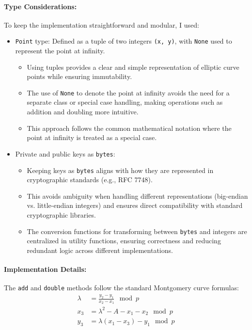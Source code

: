 \documentclass[twoside,a4paper,12pt]{article}
\begin{document}
\paragraph{Type Considerations:} 
To keep the implementation straightforward and modular, I used:
\begin{itemize}
    \item {\texttt{Point} type:} Defined as a tuple of two integers \texttt{(x, y)}, with \texttt{None} used to represent the point at infinity. 
    \begin{itemize}
        \item Using tuples provides a clear and simple representation of elliptic curve points while ensuring immutability.
        \item The use of \texttt{None} to denote the point at infinity avoids the need for a separate class or special case handling, making operations such as addition and doubling more intuitive.
        \item This approach follows the common mathematical notation where the point at infinity is treated as a special case.
    \end{itemize}
    \item Private and public keys as \texttt{bytes}:
    \begin{itemize}
        \item Keeping keys as \texttt{bytes} aligns with how they are represented in cryptographic standards (e.g., RFC 7748).
        \item This avoids ambiguity when handling different representations (big-endian vs. little-endian integers) and ensures direct compatibility with standard cryptographic libraries.
        \item The conversion functions for transforming between \texttt{bytes} and integers are centralized in utility functions, ensuring correctness and reducing redundant logic across different implementations.
    \end{itemize}
\end{itemize}

\paragraph{Implementation Details:}
The \texttt{add} and \texttt{double} methods follow the standard Montgomery curve formulas:
\begin{align}
    \lambda &= \frac{y_2 - y_1}{x_2 - x_1} \mod p \\
    x_3 &= \lambda^2 - A - x_1 - x_2 \mod p \\
    y_3 &= \lambda (x_1 - x_3) - y_1 \mod p
\end{align}
\end{document}

